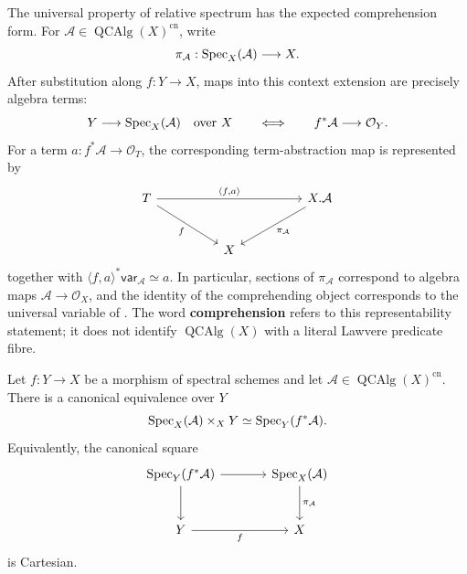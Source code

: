\begin{remark}
\label{rem:relative-spectrum-context-extension-terms}
The universal property of relative spectrum has the expected comprehension
form. For \(\mathcal A\in\operatorname{QCAlg}(X)^{\mathrm{cn}}\), write
\[
    \pi_{\mathcal A}
    :
    \operatorname{Spec}_X(\mathcal A)
    \longrightarrow
    X.
\]
After substitution along \(f:Y\to X\), maps into this context extension are
precisely algebra terms:
\[
    Y\longrightarrow\operatorname{Spec}_X(\mathcal A)
    \quad\text{over }X
    \qquad\Longleftrightarrow\qquad
    f^*\mathcal A\longrightarrow\mathcal O_Y.
\]
For a term \(a:f^*\mathcal A\to\mathcal O_T\), the corresponding
term-abstraction map is represented by
\[
\begin{tikzcd}[column sep=huge, row sep=large]
    T
        \arrow[rr, "{\langle f,a\rangle}"]
        \arrow[dr, "f"']
    &&
    X.\mathcal A
        \arrow[dl, "{\pi_{\mathcal A}}"]
    \\
    & X &
\end{tikzcd}
\]
together with
\(\langle f,a\rangle^*\mathsf{var}_{\mathcal A}\simeq a\).
In particular, sections of \(\pi_{\mathcal A}\) correspond to algebra maps
\(\mathcal A\to\mathcal O_X\), and the identity of the comprehending
object corresponds to the universal variable of
. The word
\textbf{comprehension} refers to this representability statement; it does not
identify \(\operatorname{QCAlg}(X)\) with a literal Lawvere predicate fibre.
\end{remark}

\begin{proposition}
\label{prop:relative-spectrum-base-change}
Let $f:Y\to X$ be a morphism of spectral schemes and let
$\mathcal A\in\operatorname{QCAlg}(X)^{\mathrm{cn}}$. There is a canonical
equivalence over $Y$
\[
    \operatorname{Spec}_X(\mathcal A)
    \times_X
    Y
    \simeq
    \operatorname{Spec}_Y(f^*\mathcal A).
\]
Equivalently, the canonical square
\[
\begin{tikzcd}[column sep=large, row sep=large]
    \Spec_Y(f^*\mathcal A)
        \arrow[r]
        \arrow[d]
    &
    \Spec_X(\mathcal A)
        \arrow[d, "\pi_{\mathcal A}"]
    \\
    Y
        \arrow[r, "f"']
    &
    X
\end{tikzcd}
\]
is Cartesian.
\end{proposition}

